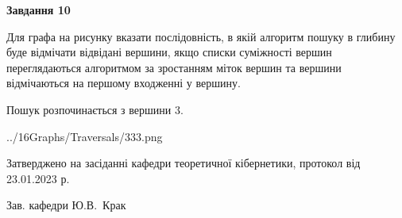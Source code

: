 \documentclass[12pt, ukrainian]{article}
\begin{document}
{\begin {large}
{\begin {center}\textbf{Завдання 10}\end {center}}\par
Для графа на рисунку вказати послідовність, в якій алгоритм пошуку в глибину буде відмічати відвідані вершини, якщо списки суміжності вершин переглядаються алгоритмом за зростанням міток вершин та вершини відмічаються на першому вход\-женні у вершину.\par
Пошук розпочинається з вершини 3.\par

\begin{center}
	{../16Graphs/Traversals/333.png}
\end{center}\par
\newpage


\end {large}
}
{\smallskip \begin {small} Затверджено на засіданні кафедри теоретичної кібернетики, протокол  від   23.01.2023 р.\par\smallskip\smallskip
{\parbox {6.5 cm}{Зав. кафедри \dotfill Ю.В.~Крак}} \end{small}}
\end{document}
